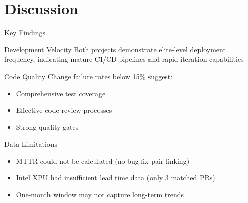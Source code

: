 \documentclass[aspectratio=169]{beamer}
\begin{document}
\section{Discussion}

\begin{frame}{Key Findings}
  \begin{block}{Development Velocity}
    Both projects demonstrate elite-level deployment frequency, indicating mature CI/CD pipelines and rapid iteration capabilities
  \end{block}

  \begin{block}{Code Quality}
    Change failure rates below 15\% suggest:
    \begin{itemize}
      \item Comprehensive test coverage
      \item Effective code review processes
      \item Strong quality gates
    \end{itemize}
  \end{block}

  \begin{block}{Data Limitations}
    \begin{itemize}
      \item MTTR could not be calculated (no bug-fix pair linking)
      \item Intel XPU had insufficient lead time data (only 3 matched PRs)
      \item One-month window may not capture long-term trends
    \end{itemize}
  \end{block}
\end{frame}
\end{document}
